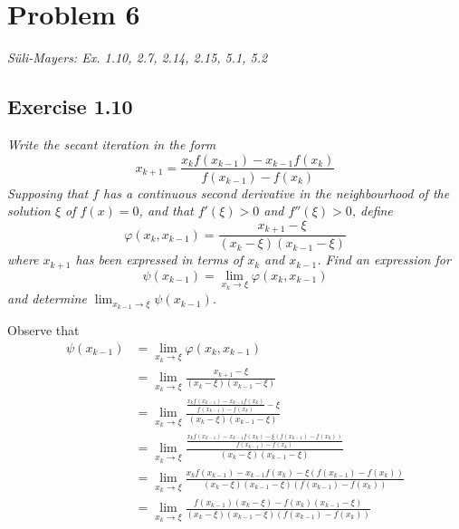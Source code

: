\section{Problem 6}
\textit{Süli-Mayers: Ex. 1.10, 2.7, 2.14, 2.15, 5.1, 5.2}

\subsection{Exercise 1.10}
\textit{Write the secant iteration in the form}
\begin{equation*}
    x_{k+1} = \frac{x_k f(x_{k-1}) - x_{k-1} f(x_k)}{f(x_{k-1}) - f(x_k)}
\end{equation*}
\textit{Supposing that $f$ has a continuous second derivative in the neighbourhood of the solution $\xi$ of $f(x) = 0$, and that $f'(\xi) > 0$ and $f''(\xi) > 0$, define}
\begin{equation*}
    \varphi(x_k, x_{k-1}) = \frac{x_{k+1} - \xi}{(x_k - \xi)(x_{k-1} - \xi)}
\end{equation*}
\textit{where $x_{k+1}$ has been expressed in terms of $x_k$ and $x_{k-1}$. Find an expression for}
\begin{equation*}
    \psi(x_{k-1}) = \lim_{x_k \to \xi} \varphi(x_k, x_{k-1})
\end{equation*}
\textit{and determine $\lim_{x_{k-1} \to \xi} \psi(x_{k-1})$.}

Observe that
\begin{align*}
    \psi(x_{k-1}) &= \lim_{x_k \to \xi} \varphi(x_k, x_{k-1}) \\
    &= \lim_{x_k \to \xi} \frac{x_{k+1} - \xi}{(x_k - \xi)(x_{k-1} - \xi)} \\
    &= \lim_{x_k \to \xi} \frac{\frac{x_k f(x_{k-1}) - x_{k-1} f(x_k)}{f(x_{k-1}) - f(x_k)} - \xi}{(x_k - \xi)(x_{k-1} - \xi)} \\
    &= \lim_{x_k \to \xi}
    \frac{
        \frac{x_k f(x_{k-1}) - x_{k-1} f(x_k) - \xi(f(x_{k-1}) - f(x_k))}
        {f(x_{k-1}) - f(x_k)}}
    {(x_k - \xi)(x_{k-1} - \xi)} \\
    &= \lim_{x_k \to \xi}
    \frac{
        x_k f(x_{k-1}) - x_{k-1} f(x_k) - \xi(f(x_{k-1}) - f(x_k))}
    {(x_k - \xi)(x_{k-1} - \xi)(f(x_{k-1}) - f(x_k))} \\
    &= \lim_{x_k \to \xi}
    \frac{
        f(x_{k-1})(x_k - \xi) - f(x_k)(x_{k-1} - \xi)}
    {(x_k - \xi)(x_{k-1} - \xi)(f(x_{k-1}) - f(x_k))} \\
\end{align*}

